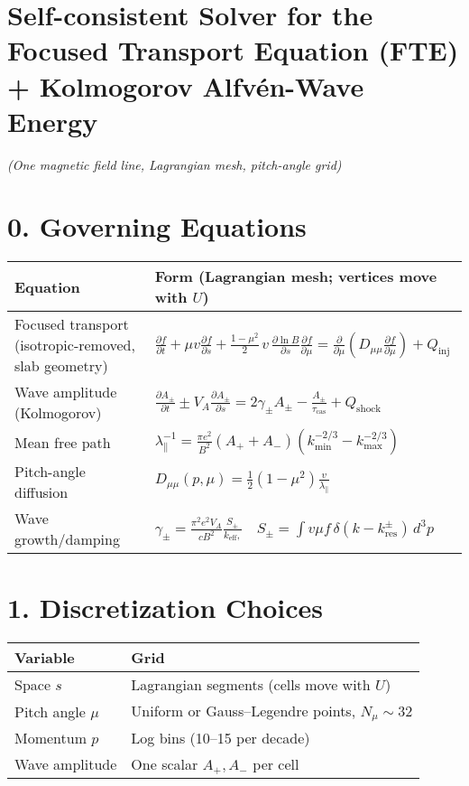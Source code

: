 \section*{Self-consistent Solver for the Focused Transport Equation (FTE) + Kolmogorov Alfvén-Wave Energy}

\emph{(One magnetic field line, Lagrangian mesh, pitch-angle grid)}

\section*{0. Governing Equations}

\begin{center}
\renewcommand{\arraystretch}{1.4}
\begin{tabular}{@{}p{} | p{}@{}}
\toprule
\textbf{Equation} & \textbf{Form (Lagrangian mesh; vertices move with $U$)} \\
\midrule
Focused transport (isotropic-removed, slab geometry) &
$\displaystyle
\frac{\partial f}{\partial t} 
+ \mu v \frac{\partial f}{\partial s}
+ \frac{1 - \mu^2}{2}\, v\, \frac{\partial \ln B}{\partial s} \frac{\partial f}{\partial \mu}
=
\frac{\partial}{\partial \mu}\left( D_{\mu\mu} \frac{\partial f}{\partial \mu} \right)
+ Q_{\text{inj}}$ \\
Wave amplitude (Kolmogorov) &
$\displaystyle
\frac{\partial A_\pm}{\partial t} 
\pm V_A \frac{\partial A_\pm}{\partial s}
= 2\gamma_\pm A_\pm - \frac{A_\pm}{\tau_{\text{cas}}} + Q_{\text{shock}}$ \\
Mean free path &
$\displaystyle
\lambda_\parallel^{-1} = \frac{\pi e^2}{B^2} (A_+ + A_-) 
\left(k_{\min}^{-2/3} - k_{\max}^{-2/3} \right)$ \\
Pitch-angle diffusion &
$\displaystyle
D_{\mu\mu}(p,\mu) = \frac{1}{2}(1 - \mu^2) \frac{v}{\lambda_\parallel}$ \\
Wave growth/damping &
$\displaystyle
\gamma_\pm = \frac{\pi^2 e^2 V_A}{c B^2} \frac{S_\pm}{k_{\text{eff}},}
\quad
S_\pm = \int v \mu f\, \delta(k - k_{\text{res}}^\pm)\, d^3p$ \\
\bottomrule
\end{tabular}
\end{center}

\section*{1. Discretization Choices}

\begin{center}
\begin{tabular}{@{}l | l@{}}
\toprule
\textbf{Variable} & \textbf{Grid} \\
\midrule
Space $s$ & Lagrangian segments (cells move with $U$) \\
Pitch angle $\mu$ & Uniform or Gauss–Legendre points, $N_\mu \sim 32$ \\
Momentum $p$ & Log bins (10–15 per decade) \\
Wave amplitude & One scalar $A_+, A_-$ per cell \\
\bottomrule
\end{tabular}
\end{center}

